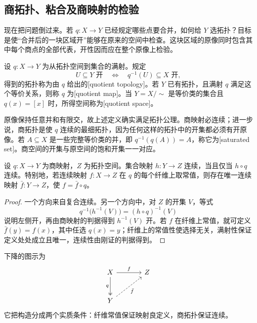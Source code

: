 \subsection{商拓扑、粘合及商映射的检验}
\label{g1:subsec:0401:03}

现在把问题倒过来。若 \(q:X\to Y\) 已经规定哪些点要合并，如何给 \(Y\) 选拓扑？目标是使“合并后的一块区域开”能够在原来的空间中检查。这块区域的原像同时包含其中每个商点的全部代表，开性因而应在整个原像上检验。

\begin{definition}[商拓扑与商映射]\label{g1:def:quotient-map}
	设 \(q:X\to Y\) 为从拓扑空间到集合的满射。规定
	\[
		U\subseteq Y\text{ 开}\quad\Longleftrightarrow\quad q^{-1}(U)\subseteq X\text{ 开},
	\]
	得到的拓扑称为由 \(q\) 给出的[quotient topology]。若 \(Y\) 已有拓扑，且满射 \(q\) 满足这个等价关系，则称 \(q\) 为[quotient map]。当 \(Y=X/{\sim}\) 是等价类的集合且 \(q(x)=[x]\) 时，所得空间称为[quotient space]。
\end{definition}

原像保持任意并和有限交，故上述定义确实满足拓扑公理。商映射必连续；进一步说，商拓扑是使 \(q\) 连续的最细拓扑，因为任何这样的拓扑中的开集都必须有开原像。若 \(A\subseteq X\) 是一些完整等价类的并，即 \(q^{-1}(q(A))=A\)，称它为[saturated set]。商空间的开集与原空间的饱和开集一一对应。

\begin{proposition}\label{g1:prop:quotient-descent}
	设 \(q:X\to Y\) 为商映射，\(Z\) 为拓扑空间。集合映射 \(h:Y\to Z\) 连续，当且仅当 \(h\circ q\) 连续。特别地，若连续映射 \(f:X\to Z\) 在 \(q\) 的每个纤维上取常值，则存在唯一连续映射 \(\bar f:Y\to Z\)，使 \(f=\bar f\circ q\)。
\end{proposition}
\begin{proof}
	一个方向来自复合连续。另一个方向中，对 \(Z\) 的开集 \(V\)，等式
	\[
		q^{-1}\bigl(h^{-1}(V)\bigr)=(h\circ q)^{-1}(V)
	\]
	说明左侧开，再由商映射的判据得到 \(h^{-1}(V)\) 开。若 \(f\) 在纤维上常值，就可定义 \(\bar f(y)=f(x)\)，其中任选 \(q(x)=y\)；纤维上的常值性使选择无关，满射性保证定义处处成立且唯一，连续性由刚证的判据得到。
\end{proof}

下降的图示为
\[
	\begin{tikzcd}[column sep=large,row sep=large]
		X \arrow[r,"f"] \arrow[d,two heads,"q"'] & Z \\
		Y \arrow[ur,dashed,"\bar f"'] &
	\end{tikzcd}
\]
它把构造分成两个实质条件：纤维常值保证映射良定义，商拓扑保证连续。


